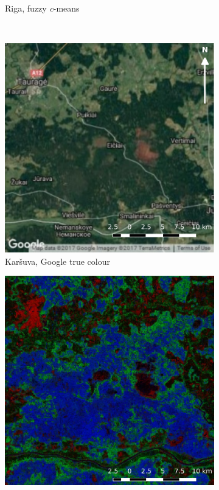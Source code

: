 \documentclass[a4paper,12pt]{scrbook}
\begin{document}
\begin{figure}
\begin{subfigure}[t]{.24\textwidth}
    \caption{Riga, fuzzy \textit{c}-means}
    \label{subfig-riga-cm}
  \end{subfigure} \
  \begin{subfigure}[t]{.24\textwidth}
    \includegraphics[width=\textwidth]{thesis-figures/figures-qgis/karsuva-google}
    \caption{Kar\v{s}uva, Google true colour}
  \end{subfigure} \hfill
  \begin{subfigure}[t]{.24\textwidth}
    \includegraphics[width=\textwidth]{thesis-figures/figures-qgis/karsuva-rf}

\end{subfigure}
\end{figure}
\end{document}
